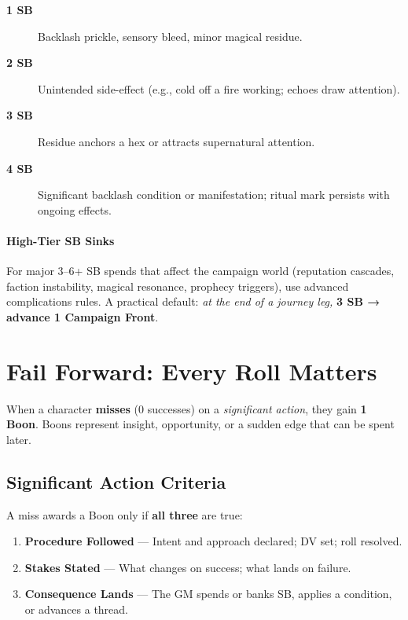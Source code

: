 \begin{description}
\item[\textbf{1 SB}] Backlash prickle, sensory bleed, minor magical residue.
\item[\textbf{2 SB}] Unintended side-effect (e.g., cold off a fire working; echoes draw attention).
\item[\textbf{3 SB}] Residue anchors a hex or attracts supernatural attention.
\item[\textbf{4 SB}] Significant backlash condition or manifestation; ritual mark persists with ongoing effects.
\end{description}

\paragraph{High-Tier SB Sinks} 
For major 3–6+ SB spends that affect the campaign world (reputation cascades, faction instability, magical resonance, prophecy triggers), use advanced complications rules. A practical default: \emph{at the end of a journey leg,} \textbf{3 SB → advance 1 Campaign Front}.

\section{Fail Forward: Every Roll Matters}
\label{sec:fail-forward}

When a character \textbf{misses} (0 successes) on a \emph{significant action}, they gain \textbf{1 Boon}. Boons represent insight, opportunity, or a sudden edge that can be spent later.

\subsection{Significant Action Criteria}
\label{subsec:significant-action}

A miss awards a Boon only if \textbf{all three} are true:
\begin{enumerate}
\item \textbf{Procedure Followed} — Intent and approach declared; DV set; roll resolved. 
\item \textbf{Stakes Stated} — What changes on success; what lands on failure. 
\item \textbf{Consequence Lands} — The GM spends or banks SB, applies a condition, or advances a thread. 
\end{enumerate}

